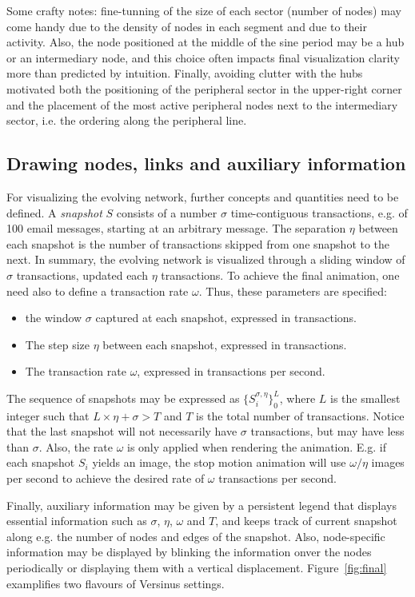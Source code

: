 \documentclass[runningheads]{llncs}
\begin{document}
\noindent Some crafty notes: fine-tunning of the size of each sector (number of nodes) may come handy due to the density of nodes in each segment and due to their activity. Also, the node positioned at the middle of the sine period may be a hub or an intermediary node, and this choice often impacts final visualization clarity more than predicted by intuition.
Finally, 
avoiding clutter with the hubs motivated both 
the positioning of the peripheral sector in the upper-right corner and
the placement of the most active peripheral nodes next to the intermediary sector, i.e. the ordering along the peripheral line.

\subsection{Drawing nodes, links and auxiliary information}
For visualizing the evolving network, further concepts and quantities need to be defined.
A \emph{snapshot} $S$ consists of a number $\sigma$ time-contiguous transactions, e.g. of 100 email messages, starting at an arbitrary message.
The separation $\eta$ between each snapshot is the number of transactions skipped from one snapshot to the next.
In summary, the evolving network is visualized through a sliding window of $\sigma$ transactions, updated each $\eta$ transactions. To achieve the final animation, one need also to define a transaction rate $\omega$.
Thus, these parameters are specified:
\begin{itemize}
  \item the window $\sigma$ captured at each snapshot, expressed in transactions.
  \item The step size $\eta$ between each snapshot, expressed in transactions.
  \item The transaction rate $\omega$, expressed in transactions per second.
\end{itemize}

\noindent The sequence of snapshots may be expressed as $\{S_i^{\sigma, \eta}\}_0^{L}$, where $L$ is the smallest integer such that $L\times \eta + \sigma > T$ and $T$ is the total number of transactions. Notice that the last snapshot will not necessarily have $\sigma$ transactions, but may have less than $\sigma$. Also, the rate $\omega$ is only applied when rendering the animation. E.g. if each snapshot $S_i$ yields an image, the stop motion animation will use $\omega/\eta$ images per second to achieve the desired rate of $\omega$ transactions per second.

Finally, auxiliary information may be given by a persistent legend that displays essential information such as $\sigma$, $\eta$, $\omega$ and $T$, and keeps track of current snapshot along e.g. the number of nodes and edges of the snapshot.
Also, node-specific information may be displayed by blinking the information onver the nodes periodically or displaying them with a vertical displacement.
Figure~\ref{fig:final} examplifies two flavours of Versinus settings.
\end{document}
